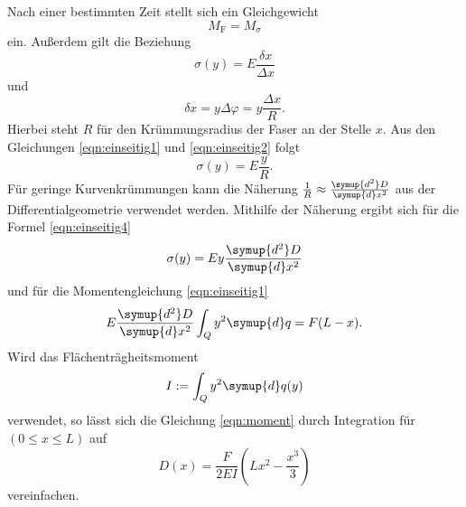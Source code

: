 Nach einer bestimmten Zeit stellt sich ein Gleichgewicht
\begin{equation}
    M_\text{F} = M_\sigma
    \label{eqn:einseitig1}
\end{equation}
ein.
Außerdem gilt die Beziehung
\begin{equation}
    \sigma(y) = E \frac{\delta x}{\Delta x}
    \label{eqn:einseitig2}
\end{equation}
und
\begin{equation}
    \delta x = y \Delta \varphi = y \frac{\Delta x}{R} .
    \label{eqn:einseitig3}
\end{equation}
Hierbei steht $R$ für den Krümmungsradius der Faser an der Stelle $x$.
Aus den Gleichungen \eqref{eqn:einseitig1} und \eqref{eqn:einseitig2} folgt
\begin{equation}
    \sigma(y) = E \frac{y}{R} .
    \label{eqn:einseitig4}
\end{equation}
Für geringe Kurvenkrümmungen kann die Näherung $\frac{1}{R} \approx \frac{\symup{d^2}D}{\symup{d}x^2}$ aus der Differentialgeometrie verwendet werden.
Mithilfe der Näherung ergibt sich für die Formel \eqref{eqn:einseitig4}
\begin{equation}
\sigma(y) = E y \frac{\symup{d^2}D}{\symup{d}x^2}
\end{equation}
und für die Momentengleichung \eqref{eqn:einseitig1}
\begin{equation}
    E \frac{\symup{d^2}D}{\symup{d}x^2} \int_Q y^2 \symup{d}q = F(L-x).
    \label{eqn:moment}
\end{equation}
Wird das Flächenträgheitsmoment
\begin{equation*}
    I := \int_Q y^2 \symup{d}q(y)
\end{equation*}
verwendet, so lässt sich die Gleichung \eqref{eqn:moment} durch Integration für $(0 \leq x \leq L)$ auf
\begin{equation}
    D(x) = \frac{F}{2EI} \left( Lx^2-\frac{x^3}{3} \right)
    \label{eqn:d_einseitig}
\end{equation}
vereinfachen.
